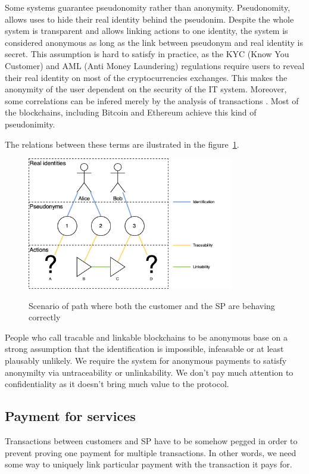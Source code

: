 \documentclass{ieeeaccess}
\begin{document}
Some systems guarantee pseudonomity rather than anonymity. Pseudonomity,
allows uses to hide their real identity behind the pseudonim. Despite
the whole system is transparent and allows linking actions to one
identity, the system is considered anonymous as long as the link between
pseudonym and real identity is secret. This assumption is hard to
satisfy in practice, as the KYC (Know You Customer) and AML (Anti Money
Laundering) regulations require users to reveal their real identity on
most of the cryptocurrencies exchanges. This makes the anonymity of the
user dependent on the security of the IT system. Moreover, some
correlations can be infered merely by the analysis of transactions
\cite{androulaki2013evaluating, ober2013structure}. Most of the
blockchains, including Bitcoin and Ethereum achieve this kind of
pseudonimity.

The relations between these terms are ilustrated in the figure~\ref{fig:anonimity-confidentality}.

\begin{figure}[h!]
\caption{Scenario of path where both the customer and  the SP are behaving correctly}
\centering
\includegraphics[width=9cm]{anonimity-confidentality.png}
\label{fig:anonimity-confidentality}
\end{figure}



People who call tracable and linkable blockchains to be anonymous base
on a strong assumption that the identification is impossible, infeasable
or at least plausably unlikely. We require the system for anonymous
payments to satisfy anonymilty via untraceability or unlinkability. We
don't pay much attention to confidentiality as it doesn't bring much
value to the protocol.


\subsection{Payment for services}\label{payment-for-services}
Transactions between customers and SP have to be somehow pegged in order
to prevent proving one payment for multiple transactions. In other
words, we need some way to uniquely link particular payment with the
transaction it pays for.
\end{document}
